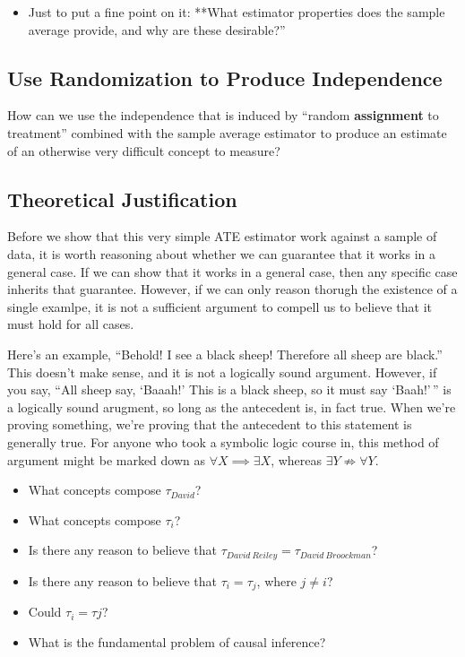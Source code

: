 \documentclass[
]{article}
\providecommand{\tightlist}{%
  \setlength{\itemsep}{0pt}\setlength{\parskip}{0pt}}
\begin{document}
\begin{itemize}
\tightlist
\item
  Just to put a fine point on it: **What estimator properties does the sample average provide, and why are these desirable?''
\end{itemize}

\hypertarget{use-randomization-to-produce-independence}{%
\subsection{Use Randomization to Produce Independence}\label{use-randomization-to-produce-independence}}

How can we use the independence that is induced by ``random \textbf{assignment} to treatment'' combined with the sample average estimator to produce an estimate of an otherwise very difficult concept to measure?

\hypertarget{theoretical-justification}{%
\subsection{Theoretical Justification}\label{theoretical-justification}}

Before we show that this very simple ATE estimator work against a sample of data, it is worth reasoning about whether we can guarantee that it works in a general case. If we can show that it works in a general case, then any specific case inherits that guarantee. However, if we can only reason thorugh the existence of a single examlpe, it is not a sufficient argument to compell us to believe that it must hold for all cases.

Here's an example, ``Behold! I see a black sheep! Therefore all sheep are black.'' This doesn't make sense, and it is not a logically sound argument. However, if you say, ``All sheep say, `Baaah!' This is a black sheep, so it must say `Baah!'\,'' is a logically sound arugment, so long as the antecedent is, in fact true. When we're proving something, we're proving that the antecedent to this statement is generally true. For anyone who took a symbolic logic course in, this method of argument might be marked down as \(\forall X \implies \exists X\), whereas \(\exists Y \not\Rightarrow \forall Y\).

\begin{itemize}
\tightlist
\item
  What concepts compose \(\tau_{David}\)?
\item
  What concepts compose \(\tau_{i}\)?
\item
  Is there any reason to believe that \(\tau_{David\ Reiley} = \tau_{David\ Broockman}\)?
\item
  Is there any reason to believe that \(\tau_{i} = \tau_{j}\), where \(j \neq i\)?
\item
  Could \(\tau_{i} = \tau{j}\)?
\item
  What is the fundamental problem of causal inference?
\end{itemize}
\end{document}

